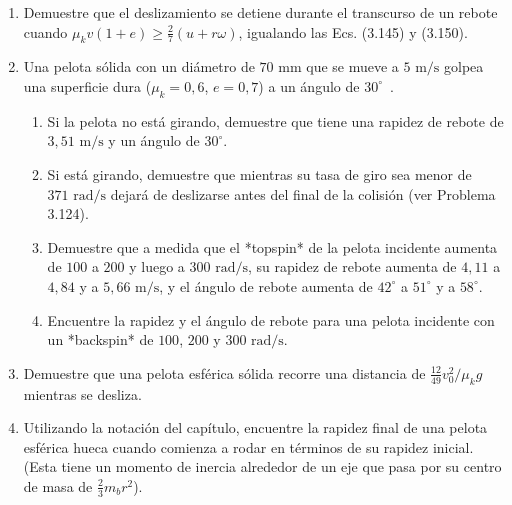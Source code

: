 \documentclass[12pt]{book}
\begin{document}
\begin{enumerate}
\item[3.124] Demuestre que el deslizamiento se detiene durante el transcurso de un rebote cuando $\mu_k v(1 + e) \ge \frac{2}{7}(u + r \omega)$, igualando las Ecs. (3.145) y (3.150).

\item[3.125] Una pelota sólida con un diámetro de $70\text{ mm}$ que se mueve a $5\text{ m/s}$ golpea una superficie dura ($\mu_k = 0{,}6$, $e = 0{,}7$) a un ángulo de $30^\circ$~\cite{ref36}.
\begin{enumerate}
\item[(a)] Si la pelota no está girando, demuestre que tiene una rapidez de rebote de $3{,}51\text{ m/s}$ y un ángulo de $30^\circ$.
\item[(b)] Si está girando, demuestre que mientras su tasa de giro sea menor de $371\text{ rad/s}$ dejará de deslizarse antes del final de la colisión (ver Problema 3.124).
\item[(c)] Demuestre que a medida que el *topspin* de la pelota incidente aumenta de $100$ a $200$ y luego a $300\text{ rad/s}$, su rapidez de rebote aumenta de $4{,}11$ a $4{,}84$ y a $5{,}66\text{ m/s}$, y el ángulo de rebote aumenta de $42^\circ$ a $51^\circ$ y a $58^\circ$.
\item[(d)] Encuentre la rapidez y el ángulo de rebote para una pelota incidente con un *backspin* de $100$, $200$ y $300\text{ rad/s}$.
\end{enumerate}

\item[3.126] Demuestre que una pelota esférica sólida recorre una distancia de $\frac{12}{49} v_0^2 / \mu_k g$ mientras se desliza.

\item[3.127] Utilizando la notación del capítulo, encuentre la rapidez final de una pelota esférica hueca cuando comienza a rodar en términos de su rapidez inicial. (Esta tiene un momento de inercia alrededor de un eje que pasa por su centro de masa de $\frac{2}{3} m_b r^2$).


\end{enumerate}
\end{document}
